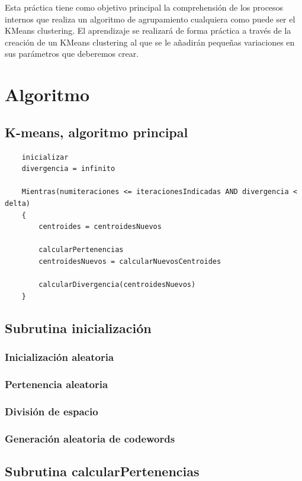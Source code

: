 \documentclass[a4paper]{report}
\begin{document}
	Esta práctica tiene como objetivo principal la comprehensión de los procesos internos que realiza un algoritmo de agrupamiento cualquiera como puede ser el KMeans clustering. El aprendizaje se realizará de forma práctica a través de la creación de un KMeans clustering al que se le añadirán pequeñas variaciones en sus parámetros que deberemos crear. 
\chapter{Algoritmo}

	\section{K-means, algoritmo principal}
	
	\begin{verbatim}
	inicializar
	divergencia = infinito 
	
	Mientras(numiteraciones <= iteracionesIndicadas AND divergencia < delta)
	{
	    centroides = centroidesNuevos 
	
	    calcularPertenencias
	    centroidesNuevos = calcularNuevosCentroides
		
	    calcularDivergencia(centroidesNuevos) 
	}
	\end{verbatim}
	
	\section{Subrutina inicialización}
		\subsection{Inicialización aleatoria}
		
		\subsection{Pertenencia aleatoria}
		
		\subsection{División de espacio}
		
		\subsection{Generación aleatoria de codewords}
	
	\section{Subrutina calcularPertenencias}
	
\end{document}
